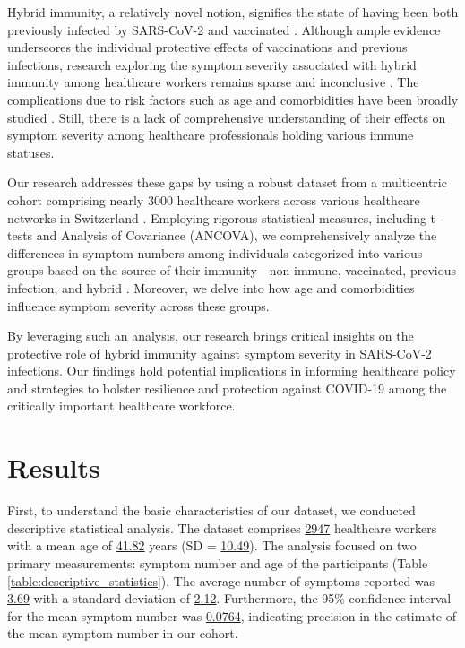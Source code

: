 \documentclass[11pt]{article}
\begin{document}
Hybrid immunity, a relatively novel notion, signifies the state of having been both previously infected by SARS-CoV-2 and vaccinated \cite{Azkur2020ImmuneRT}. Although ample evidence underscores the individual protective effects of vaccinations and previous infections, research exploring the symptom severity associated with hybrid immunity among healthcare workers remains sparse and inconclusive \cite{Vishnoi2023SeverityAO, Braud2022ImpactOV}. The complications due to risk factors such as age and comorbidities have been broadly studied \cite{Munywoki2014InfluenceOA, Zhang2022RiskAP}. Still, there is a lack of comprehensive understanding of their effects on symptom severity among healthcare professionals holding various immune statuses. 

Our research addresses these gaps by using a robust dataset from a multicentric cohort comprising nearly 3000 healthcare workers across various healthcare networks in Switzerland \cite{Memish2014ScreeningFM, Regina2020EpidemiologyRF}. Employing rigorous statistical measures, including t-tests and Analysis of Covariance (ANCOVA), we comprehensively analyze the differences in symptom numbers among individuals categorized into various groups based on the source of their immunity—non-immune, vaccinated, previous infection, and hybrid \cite{Schwarz2017AnalysisOM, Tsanas2011NonlinearSA}. Moreover, we delve into how age and comorbidities influence symptom severity across these groups.

By leveraging such an analysis, our research brings critical insights on the protective role of hybrid immunity against symptom severity in SARS-CoV-2 infections. Our findings hold potential implications in informing healthcare policy and strategies to bolster resilience and protection against COVID-19 among the critically important healthcare workforce.

\section*{Results}

First, to understand the basic characteristics of our dataset, we conducted descriptive statistical analysis. The dataset comprises \hyperlink{R0a}{2947} healthcare workers with a mean age of \hyperlink{R1a}{41.82} years (SD = \hyperlink{R2a}{10.49}). The analysis focused on two primary measurements: symptom number and age of the participants (Table \ref{table:descriptive_statistics}). The average number of symptoms reported was \hyperlink{A0a}{3.69} with a standard deviation of \hyperlink{A1a}{2.12}. Furthermore, the 95\% confidence interval for the mean symptom number was \hyperlink{A3a}{0.0764}, indicating precision in the estimate of the mean symptom number in our cohort.
\end{document}

